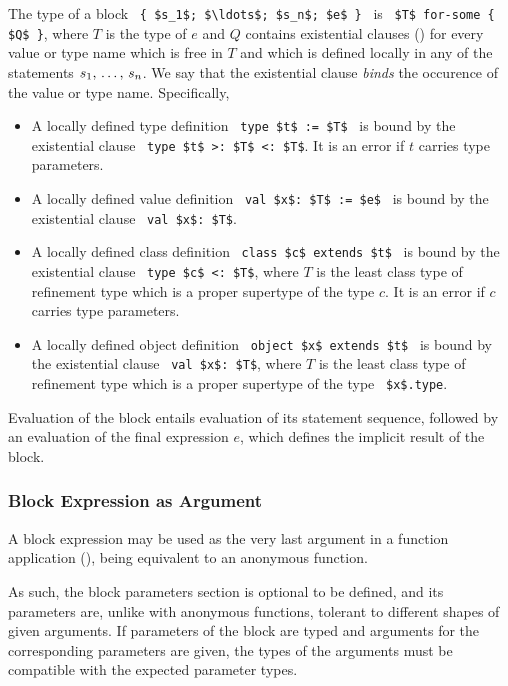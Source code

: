 The type of a block ~\lstinline!{ $s_1$; $\ldots$; $s_n$; $e$ }!~ is ~\lstinline!$T$ for-some { $Q$ }!, where $T$ is the type of $e$ and $Q$ contains existential clauses () for every value or type name which is free in $T$ and which is defined locally in any of the statements $s_1 ,\, \ldots ,\, s_n$. We say that the existential clause {\em binds} the occurence of the value or type name. Specifically, 
\begin{itemize}

\item A locally defined type definition ~\lstinline!type $t$ := $T$!~ is bound by the existential clause ~\lstinline!type $t$ >: $T$ <: $T$!. It is an error if $t$ carries type parameters. 

\item A locally defined value definition ~\lstinline!val $x$: $T$ := $e$!~ is bound by the existential clause ~\lstinline!val $x$: $T$!. 

\item A locally defined class definition ~\lstinline!class $c$ extends $t$!~ is bound by the existential clause ~\lstinline!type $c$ <: $T$!, where $T$ is the least class type of refinement type which is a proper supertype of the type $c$. It is an error if $c$ carries type parameters. 

\item A locally defined object definition ~\lstinline!object $x$ extends $t$!~ is bound by the existential clause ~\lstinline!val $x$: $T$!, where $T$ is the least class type of refinement type which is a proper supertype of the type ~\lstinline!$x$.type!.
\end{itemize}

Evaluation of the block entails evaluation of its statement sequence, followed by an evaluation of the final expression $e$, which defines the implicit result of the block. 





\subsubsection{Block Expression as Argument}
\label{sec:block-arguments}

A block expression may be used as the very last argument in a function application (), being equivalent to an anonymous function. 

As such, the block parameters section is optional to be defined, and its parameters are, unlike with anonymous functions, tolerant to different shapes of given arguments. If parameters of the block are typed and arguments for the corresponding parameters are given, the types of the arguments must be compatible with the expected parameter types. 

